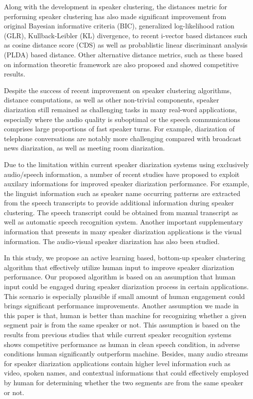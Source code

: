 \documentclass[final,authoryear,5p,times,twocolumn]{elsarticle}
\begin{document}
Along with the development in speaker clustering, the distances metric for performing speaker clustering has also made significant improvement from original Bayesian informative criteria (BIC), generalized log-likelihood ration (GLR), Kullback-Leibler (KL) divergence, to recent i-vector based distances such as cosine distance score (CDS) as well as probablistic linear discriminant analysis (PLDA) based distance. Other alternative distance metrics, such as these based on information theoretic framework are also proposed and showed competitive results. 

Despite the success of recent improvement on speaker clustering algorithms, distance computations, as well as other non-trivial components, speaker diarization still remained as challenging tasks in many real-word applications, especially where the audio quality is suboptimal or the speech communications comprises large proportions of fast speaker turns. For example, diarization of telephone conversations are notably more challenging compared with broadcast news diarization, as well as meeting room diarization. 

Due to the limitation within current speaker diarization systems using exclusively audio/speech information, a number of recent studies have proposed to exploit auxilary informations for improved speaker diarization performance. For example, the linguist information such as speaker name occurring patterns are extracted from the speech transcripts to provide additional information during speaker clustering. The speech transcript could be obtained from manual transcript as well as automatic speech recognition system. Another important supplementary information that presents in many speaker diarization applications is the visual information. The audio-visual speaker diarization has also been studied.

In this study, we propose an active learning based, bottom-up speaker clustering algorithm that effectively utilize human input to improve speaker diarization performance. Our proposed algorithm is based on an assumption that human input could be engaged during speaker diarization process in certain applications. This scenario is especially plausible if small amount of human engagement could brings significant performance improvements. Another assumption we made in this paper is that, human is better than machine for recognizing whether a given segment pair is from the same speaker or not. This assumption is based on the results from previous studies that while current speaker recognition systems shows competitive performance as human in clean speech condition, in adverse conditions human significantly outperform machine. Besides, many audio streams for speaker diarization applications contain higher level information such as video, spoken names, and contextual informations that could effectively employed by human for determining whether the two segments are from the same speaker or not.
\end{document}
